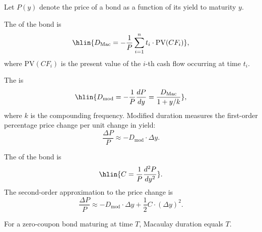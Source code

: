 \begin{definition} \label{definition:duration_and_convexity_of_a_bond}
Let $P(y)$ denote the price of a bond as a function of its yield to maturity $y$.

The  of the bond is
$$\hlin{D_{\text{Mac}} = -\frac{1}{P} \sum_{i=1}^n t_i \cdot \text{PV}(CF_i)},$$
where $\text{PV}(CF_i)$ is the present value of the $i$-th cash flow occurring at time $t_i$.

The  is
$$\hlin{D_{\text{mod}} = -\frac{1}{P} \frac{dP}{dy} = \frac{D_{\text{Mac}}}{1 + y/k}},$$
where $k$ is the compounding frequency. Modified duration measures the first-order percentage price change per unit change in yield:
$$\frac{\Delta P}{P} \approx -D_{\text{mod}} \cdot \Delta y.$$

The  of the bond is
$$\hlin{C = \frac{1}{P} \frac{d^2P}{dy^2}}.$$
The second-order approximation to the price change is
$$\frac{\Delta P}{P} \approx -D_{\text{mod}} \cdot \Delta y + \frac{1}{2} C \cdot (\Delta y)^2.$$

For a zero-coupon bond maturing at time $T$, Macaulay duration equals $T$.
\end{definition}